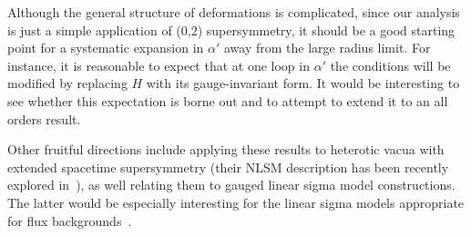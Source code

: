 \documentclass[11pt, a4paper]{article}
\begin{document}
Although the general structure of deformations is complicated, since our analysis is just a simple application 
of (0,2) supersymmetry, it should be a good starting point for a systematic expansion in $\alpha'$ away from
the large radius limit.  For instance, it is reasonable
to expect that at one loop in $\alpha'$ the conditions will be modified by replacing $H$ with its gauge-invariant
form.  It would be interesting to see whether this expectation is borne out and to attempt to extend it to
an all orders result.

Other fruitful directions include applying these results to heterotic vacua with extended
spacetime supersymmetry (their NLSM description has been recently explored in~\cite{Melnikov:2010pq}),
as well relating them to gauged linear sigma model constructions.  The latter would be especially
interesting for the linear sigma models appropriate for flux backgrounds~\cite{Adams:2006kb,Blaszczyk:2011pg,Quigley:2011pg}. 
\end{document}
